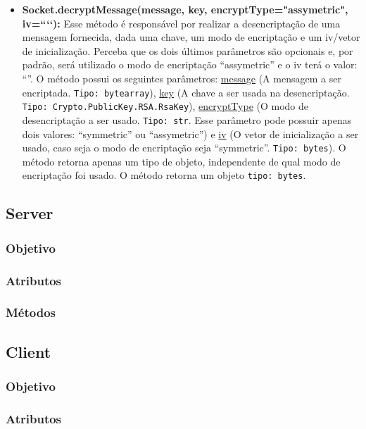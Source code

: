 \documentclass[10pt]{article}
\begin{document}
\begin{itemize}
\begin{itemize}
            \item \textbf{Socket.decryptMessage(message, key, encryptType="assymetric", iv=“‘‘):} Esse método é responsável por realizar a desencriptação de uma mensagem fornecida, dada uma chave, um modo de encriptação e um iv/vetor de inicialização. Perceba que os dois últimos parâmetros são opcionais e, por padrão, será utilizado o modo de encriptação “assymetric” e o iv terá o valor: “”. O método possui os seguintes parâmetros: \underline{message} (A mensagem a ser encriptada. \texttt{Tipo: bytearray}), \underline{key} (A chave a ser usada na desencriptação. \texttt{Tipo: Crypto.PublicKey.RSA.RsaKey}), \underline{encryptType} (O modo de desencriptação a ser usado. \texttt{Tipo: str}. Esse parâmetro pode possuir apenas dois valores: “symmetric” ou “assymetric”) e \underline{iv} (O vetor de inicialização a ser usado, caso seja o modo de encriptação seja “symmetric”. \texttt{Tipo: bytes}). O método retorna apenas um tipo de objeto, independente de qual modo de encriptação foi usado. O método retorna um objeto \texttt{tipo: bytes}.
            
            \end{itemize}
        
    \subsection{\Large Server}
        \subsubsection{\large Objetivo}
        \subsubsection{\large Atributos}
        \subsubsection{\large Métodos}
        
    \subsection{\Large Client}
        \subsubsection{\large Objetivo}
        \subsubsection{\large Atributos}

\end{itemize}
\end{document}
